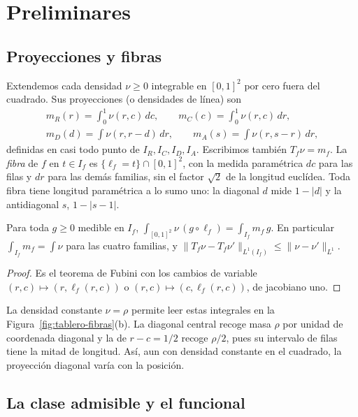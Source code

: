 \section{Preliminares}\label{sec:preliminares}

\subsection{Proyecciones y fibras}

Extendemos cada densidad $\nu\ge0$ integrable en $[0,1]^2$ por cero fuera del cuadrado. Sus
proyecciones (o densidades de línea) son
\begin{gather*}
 m_R(r)=\int_0^1\nu(r,c)\,dc,\qquad m_C(c)=\int_0^1\nu(r,c)\,dr,\\
 m_D(d)=\int\nu(r,r-d)\,dr,\qquad m_A(s)=\int\nu(r,s-r)\,dr,
\end{gather*}
definidas en casi todo punto de $I_R,I_C,I_D,I_A$. Escribimos también $T_f\nu=m_f$. La \emph{fibra}
de $f$ en $t\in I_f$ es $\{\ell_f=t\}\cap[0,1]^2$, con la medida paramétrica $dc$ para las filas y
$dr$ para las demás familias, sin el factor $\sqrt2$ de la longitud euclídea. Toda fibra tiene
longitud paramétrica a lo sumo uno: la diagonal $d$ mide $1-|d|$ y la antidiagonal $s$, $1-|s-1|$.

\begin{lema}\label{lem:fubini}
Para toda $g\ge0$ medible en $I_f$, $\int_{[0,1]^2}\nu\,(g\circ\ell_f)=\int_{I_f}m_f\,g$. En
particular $\int_{I_f}m_f=\int\nu$ para las cuatro familias, y
$\|T_f\nu-T_f\nu'\|_{L^1(I_f)}\le\|\nu-\nu'\|_{L^1}$.
\end{lema}

\begin{proof}
Es el teorema de Fubini con los cambios de variable $(r,c)\mapsto(r,\ell_f(r,c))$ o
$(r,c)\mapsto(c,\ell_f(r,c))$, de jacobiano uno.
\end{proof}

La densidad constante $\nu=\rho$ permite leer estas integrales en la Figura~\ref{fig:tablero-fibras}(b).
La diagonal central recoge masa $\rho$ por unidad de coordenada diagonal y la de
$r-c=1/2$ recoge $\rho/2$, pues su intervalo de filas tiene la mitad de longitud.
Así, aun con densidad constante en el cuadrado, la proyección diagonal varía con la posición.

\subsection{La clase admisible y el funcional}

